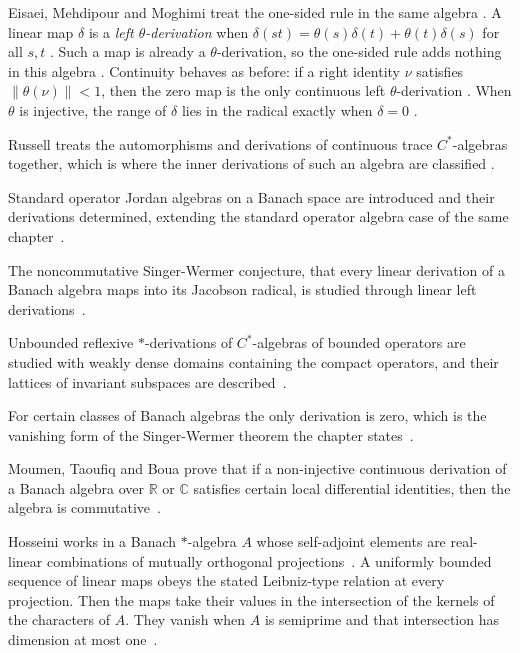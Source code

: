 Eisaei, Mehdipour and Moghimi treat the one-sided rule in the same algebra
\cite[p.~2]{EisaeiMehdipourMoghimi2024LeftTheta}. A linear map $\delta$ is a
\emph{left $\theta$-derivation} when
$\delta(st)=\theta(s)\delta(t)+\theta(t)\delta(s)$ for all $s,t$
\cite[p.~2]{EisaeiMehdipourMoghimi2024LeftTheta}. Such a map is already a
$\theta$-derivation, so the one-sided rule adds nothing in this algebra
\cite[Theorem~2.2, p.~4]{EisaeiMehdipourMoghimi2024LeftTheta}. Continuity
behaves as before: if a right identity $\nu$ satisfies $\|\theta(\nu)\|<1$,
then the zero map is the only continuous left $\theta$-derivation
\cite[Corollary~2.5, p.~6]{EisaeiMehdipourMoghimi2024LeftTheta}. When $\theta$
is injective, the range of $\delta$ lies in the radical exactly when
$\delta=0$ \cite[Theorem~2.7, p.~7]{EisaeiMehdipourMoghimi2024LeftTheta}.

Russell treats the automorphisms and derivations of continuous trace
$C^{*}$-algebras together, which is where the inner derivations of such an
algebra are classified \cite[Abstract, p.~1]{Russell1980ContinuousTrace}.

Standard operator Jordan algebras on a Banach space are introduced and their
derivations determined, extending the standard operator algebra case of the
same chapter~\cite{WlStandardOperatorJordan2022}.

The noncommutative Singer-Wermer conjecture, that every linear derivation of a
Banach algebra maps into its Jacobson radical, is studied through linear left
derivations~\cite{WlNoncommutativeVersionsOf2008}.

Unbounded reflexive $*$-derivations of $C^*$-algebras of bounded operators are
studied with weakly dense domains containing the compact operators, and their
lattices of invariant subspaces are
described~\cite{WlReflexiveStarDerivationsAndLat2017}.

For certain classes of Banach algebras the only derivation is zero, which is
the vanishing form of the Singer-Wermer theorem the chapter
states~\cite{WlNonexistenceOfNonzeroDerivatio2014}.

Moumen, Taoufiq and Boua prove that if a non-injective continuous derivation
of a Banach algebra over $\mathbb{R}$ or $\mathbb{C}$ satisfies certain local
differential identities, then the algebra is
commutative~\cite{WlOnPrimeBanachAlgebrasWithConti2023}.

Hosseini works in a Banach $*$-algebra $A$ whose self-adjoint elements are
real-linear combinations of mutually orthogonal projections~\cite{WlSomeConditionsUnderWhichDeriva2017}. A uniformly
bounded sequence of linear maps obeys the stated Leibniz-type relation at
every projection. Then the maps take their values in the intersection of the %
kernels of the characters of $A$. They vanish when $A$ is semiprime and that
intersection has dimension at most
one~\cite{WlSomeConditionsUnderWhichDeriva2017}.

